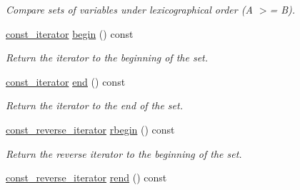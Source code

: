 \begin{DoxyCompactItemize}
\begin{DoxyCompactList}\small\item\em Compare sets of variables under lexicographical order (A $>$= B). \end{DoxyCompactList}\item 
\hypertarget{classmerlin_1_1variable__set_a72822ad33e7d18919cda9bf721aab9c8}{}\hyperlink{classmerlin_1_1variable__set_1_1const__iterator}{const\+\_\+iterator} \hyperlink{classmerlin_1_1variable__set_a72822ad33e7d18919cda9bf721aab9c8}{begin} () const \label{classmerlin_1_1variable__set_a72822ad33e7d18919cda9bf721aab9c8}

\begin{DoxyCompactList}\small\item\em Return the iterator to the beginning of the set. \end{DoxyCompactList}\item 
\hypertarget{classmerlin_1_1variable__set_ae684fea7c4516f9555bb0537e86101d4}{}\hyperlink{classmerlin_1_1variable__set_1_1const__iterator}{const\+\_\+iterator} \hyperlink{classmerlin_1_1variable__set_ae684fea7c4516f9555bb0537e86101d4}{end} () const \label{classmerlin_1_1variable__set_ae684fea7c4516f9555bb0537e86101d4}

\begin{DoxyCompactList}\small\item\em Return the iterator to the end of the set. \end{DoxyCompactList}\item 
\hypertarget{classmerlin_1_1variable__set_a0b49d4d2a5329621f7d4f10ab6198791}{}\hyperlink{classmerlin_1_1variable__set_a4d523eb96935f7215e5b6f2e968f7f0a}{const\+\_\+reverse\+\_\+iterator} \hyperlink{classmerlin_1_1variable__set_a0b49d4d2a5329621f7d4f10ab6198791}{rbegin} () const \label{classmerlin_1_1variable__set_a0b49d4d2a5329621f7d4f10ab6198791}

\begin{DoxyCompactList}\small\item\em Return the reverse iterator to the beginning of the set. \end{DoxyCompactList}\item 
\hypertarget{classmerlin_1_1variable__set_aa1700c00f84ce93c23561e22bb621711}{}\hyperlink{classmerlin_1_1variable__set_a4d523eb96935f7215e5b6f2e968f7f0a}{const\+\_\+reverse\+\_\+iterator} \hyperlink{classmerlin_1_1variable__set_aa1700c00f84ce93c23561e22bb621711}{rend} () const \label{classmerlin_1_1variable__set_aa1700c00f84ce93c23561e22bb621711}


\end{DoxyCompactItemize}
